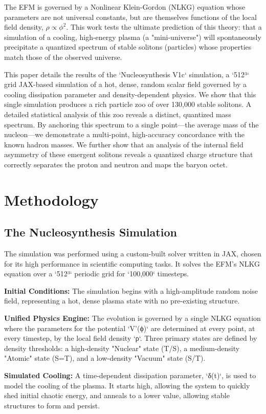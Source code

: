 \documentclass[11pt]{article}
\begin{document}
The EFM is governed by a Nonlinear Klein-Gordon (NLKG) equation whose parameters are not universal constants, but are themselves functions of the local field density, \(\rho \propto \phi^2\). This work tests the ultimate prediction of this theory: that a simulation of a cooling, high-energy plasma (a "mini-universe") will spontaneously precipitate a quantized spectrum of stable solitons (particles) whose properties match those of the observed universe.

This paper details the results of the `Nucleosynthesis V1c` simulation, a `512³` grid JAX-based simulation of a hot, dense, random scalar field governed by a cooling dissipation parameter and density-dependent physics. We show that this single simulation produces a rich particle zoo of over 130,000 stable solitons. A detailed statistical analysis of this zoo reveals a distinct, quantized mass spectrum. By anchoring this spectrum to a single point—the average mass of the nucleon—we demonstrate a multi-point, high-accuracy concordance with the known hadron masses. We further show that an analysis of the internal field asymmetry of these emergent solitons reveals a quantized charge structure that correctly separates the proton and neutron and maps the baryon octet.

\section{Methodology}
\subsection{The Nucleosynthesis Simulation}
The simulation was performed using a custom-built solver written in JAX, chosen for its high performance in scientific computing tasks. It solves the EFM's NLKG equation over a `512³` periodic grid for `100,000` timesteps.

\textbf{Initial Conditions:} The simulation begins with a high-amplitude random noise field, representing a hot, dense plasma state with no pre-existing structure.

\textbf{Unified Physics Engine:} The evolution is governed by a single NLKG equation where the parameters for the potential `V'(ϕ)` are determined at every point, at every timestep, by the local field density `ρ`. Three primary states are defined by density thresholds: a high-density "Nuclear" state (T/S), a medium-density "Atomic" state (S=T), and a low-density "Vacuum" state (S/T).

\textbf{Simulated Cooling:} A time-dependent dissipation parameter, `δ(t)`, is used to model the cooling of the plasma. It starts high, allowing the system to quickly shed initial chaotic energy, and anneals to a lower value, allowing stable structures to form and persist.
\end{document}
